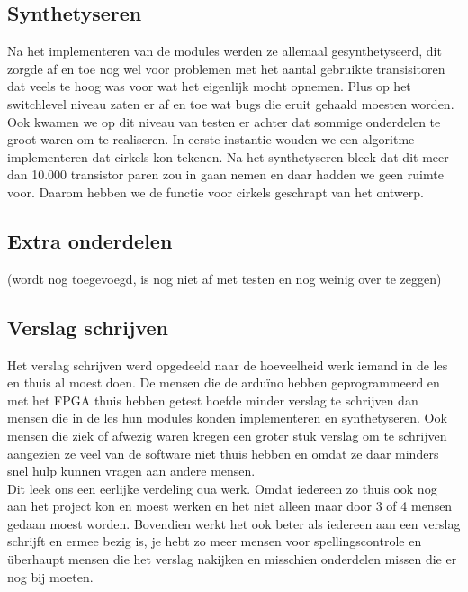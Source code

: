 \documentclass{scrartcl} %
\begin{document}
\subsection{Synthetyseren}

Na het implementeren van de modules werden ze allemaal gesynthetyseerd, dit zorgde af en toe nog wel voor problemen met het aantal gebruikte transisitoren dat veels te hoog was voor wat het eigenlijk mocht opnemen. Plus op het switchlevel niveau zaten er af en toe 
wat bugs die eruit gehaald moesten worden. Ook kwamen we op dit niveau van testen er achter dat sommige onderdelen te groot waren om te realiseren. In eerste instantie wouden we een algoritme implementeren dat cirkels kon tekenen. Na het synthetyseren bleek dat dit 
meer dan 10.000 transistor paren zou in gaan nemen en daar hadden we geen ruimte voor. Daarom hebben we de functie voor cirkels geschrapt van het ontwerp.


\subsection{Extra onderdelen}

(wordt nog toegevoegd, is nog niet af met testen en nog weinig over te zeggen)

\subsection{Verslag schrijven}

Het verslag schrijven werd opgedeeld naar de hoeveelheid werk iemand in de les en thuis al moest doen. De mensen die de arduïno hebben geprogrammeerd en met het FPGA thuis hebben getest hoefde minder verslag te schrijven dan mensen die in de les hun modules konden
implementeren en synthetyseren. Ook mensen die ziek of afwezig waren kregen een groter stuk verslag om te schrijven aangezien ze veel van de software niet thuis hebben en omdat ze daar minders snel hulp kunnen vragen aan andere mensen.\\
Dit leek ons een eerlijke verdeling qua werk. Omdat iedereen zo thuis ook nog aan het project kon en moest werken en het niet alleen maar door 3 of 4 mensen gedaan moest worden. Bovendien werkt het ook beter als iedereen aan een verslag schrijft en ermee bezig is, je hebt zo meer mensen voor spellingscontrole en überhaupt mensen die het verslag nakijken en misschien onderdelen missen die er nog bij moeten.
\end{document}
